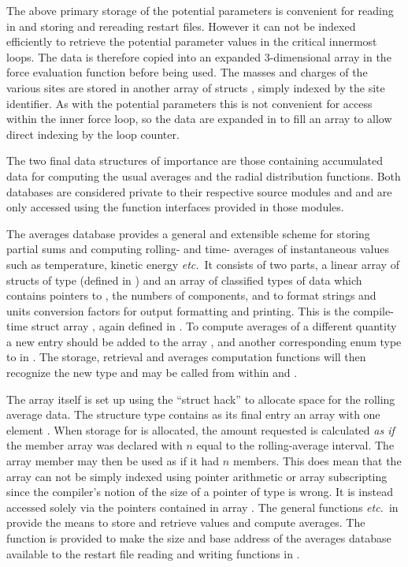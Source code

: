 \documentclass[a4paper,twoside]{report}
\newcommand{\etc}{\emph{etc.}}
\begin{document}
The above primary storage of the potential parameters is convenient
for reading in and storing and rereading restart files.  However it
can not be indexed efficiently to retrieve the potential parameter
values in the critical innermost loops.  The data is therefore copied
into an expanded 3-dimensional array
 in the force evaluation function
 before being used.  The masses and charges of the
various sites are stored in another array of structs
, simply indexed by the site identifier. As with the
potential parameters this is not convenient for access within the
inner force loop, so the data are expanded in  to fill
an array  to allow direct indexing by the loop
counter.

The two final data structures of importance are those containing
accumulated data for computing the usual averages and the radial
distribution functions.  Both databases are considered private to
their respective source modules  and 
and are only accessed using the function interfaces provided in those
modules.

The averages database provides a general and extensible scheme for
storing partial sums and computing rolling- and time- averages of
instantaneous values such as temperature, kinetic energy \etc\ It
consists of two parts, a linear array  of structs of type
 (defined in ) and an array of classified
types of data which contains pointers to , the numbers of
components, and to format strings and units conversion factors for
output formatting and printing.  This is the compile-time struct array
, again defined in . To compute
averages of a different quantity a new entry should be added to the
array , and another corresponding enum type to  in .  The storage, retrieval and averages
computation functions will then recognize the new type and may be
called from within  and .

The array  itself is set up using the ``struct hack'' to
allocate space for the rolling average data.  The structure type
 contains as its final entry an array with one element
.  When storage for  is allocated, the
amount requested is calculated \emph{as if} the member array was
declared  with $n$ equal to the rolling-average
interval.  The array member  may then be used as if it
had $n$ members.  This does mean that the array  can not be
simply indexed using pointer arithmetic or array subscripting since
the compiler's notion of the size of a pointer of type
 is wrong.  It is instead accessed solely via the
pointers contained in array .  The general functions
 \etc\ in  provide the means to
store and retrieve values and compute averages.  The function
 is provided to make the size and base address of
the averages database available to the restart file reading and
writing functions in .
\end{document}
